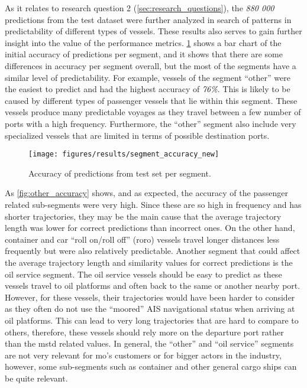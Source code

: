 As it relates to research question 2 (\cref{sec:research_questions}), the \textit{880 000} predictions from the test dataset were further analyzed in search of patterns in predictability of different types of vessels. These results also serves to gain further insight into the value of the performance metrics. \cref{fig:segment_accuracy} shows a bar chart of the initial accuracy of predictions per segment, and it shows that there are some differences in accuracy per segment overall, but the most of the segments have a similar level of predictability. For example, vessels of the segment ``other'' were the easiest to predict and had the highest accuracy of \textit{76\%}. This is likely to be caused by different types of passenger vessels that lie within this segment. These vessels produce many predictable voyages as they travel between a few number of ports with a high frequency. Furthermore, the ``other'' segment also include very specialized vessels that are limited in terms of possible destination ports.

\begin{figure}[htbp]
    \centering
    \texttt{[image: figures/results/segment\_accuracy\_new]}
    \caption{Accuracy of predictions from test set per segment.}
    \label{fig:segment_accuracy}
\end{figure}

As \cref{fig:other_accuracy} shows, and as expected, the accuracy of the passenger related sub-segments were very high. Since these are so high in frequency and has shorter trajectories, they may be the main cause that the average trajectory length was lower for correct predictions than incorrect ones. On the other hand, container and car ``roll on/roll off'' (roro) vessels travel longer distances less frequently but were also relatively predictable. Another segment that could affect the average trajectory length and similarity values for correct predictions is the oil service segment. The oil service vessels should be easy to predict as these vessels travel to oil platforms and often back to the same or another nearby port. However, for these vessels, their trajectories would have been harder to consider as they often do not use the ``moored'' AIS navigational status when arriving at oil platforms. This can lead to very long trajectories that are hard to compare to others, therefore, these vessels should rely more on the departure port rather than the \acrshort{mstd} related values. In general, the ``other'' and ``oil service'' segments are not very relevant for \acrfull{mo}'s customers or for bigger actors in the industry, however, some sub-segments such as container and other general cargo ships can be quite relevant.

